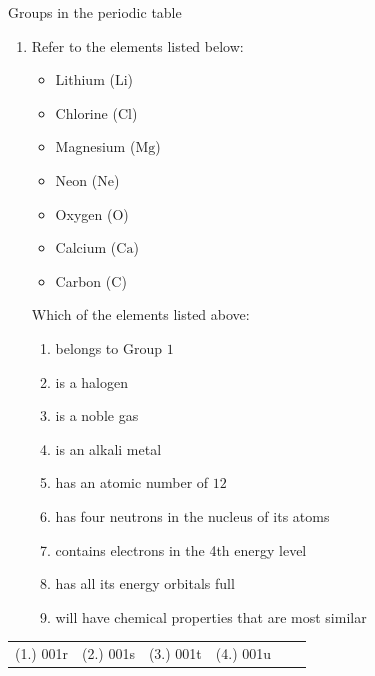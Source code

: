 \begin{exercises}{Groups in the periodic table}
\begin{enumerate}[noitemsep, label=\textbf{\arabic*}. ]
\item            \label{m38760*id262476}Refer to the elements listed below: \label{m38760*id7632}\begin{itemize}[noitemsep]
            \item Lithium ($\mathrm{Li}$)\item Chlorine ($\mathrm{Cl}$)\item Magnesium ($\mathrm{Mg}$)\item Neon ($\mathrm{Ne}$)\item Oxygen ($\mathrm{O}$)\item Calcium ($\mathrm{Ca}$)\item Carbon ($\mathrm{C}$)\end{itemize}
         Which of the elements listed above:
        \label{m38760*id262499}\begin{enumerate}[noitemsep, label=\textbf{\alph*}. ] 
            \label{m38760*uid158}\item belongs to Group $1$
\label{m38760*uid159}\item is a halogen
\label{m38760*uid160}\item is a noble gas
\label{m38760*uid161}\item is an alkali metal
\label{m38760*uid162}\item has an atomic number of $12$
\label{m38760*uid163}\item has four neutrons in the nucleus of its atoms
\label{m38760*uid164}\item contains electrons in the 4th energy level
\label{m38760*uid166}\item has all its energy orbitals full
\label{m38760*uid167}\item will have chemical properties that are most similar
\end{enumerate}
\end{enumerate}
         \par 
\label{m38760**end}
\practiceinfo
\par 
 \par \begin{tabular}[h]{cccccc}
 (1.) 001r  & (2.) 001s & (3.) 001t & (4.) 001u \end{tabular}

\end{exercises}
